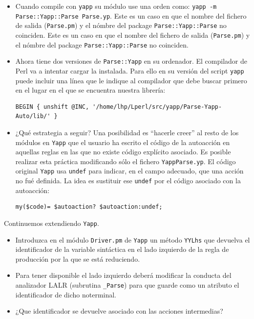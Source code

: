 \begin{itemize}
\item
Cuando compile con \verb|yapp| su módulo use 
una orden como: \verb|yapp -m Parse::Yapp::Parse Parse.yp|. 
Este es un caso en que el nombre del fichero de salida (\verb|Parse.pm|)
y el nómbre del package \verb|Parse::Yapp::Parse| no coinciden. 
Este es un caso en que el nombre del fichero de salida (\verb|Parse.pm|)
y el nómbre del package \verb|Parse::Yapp::Parse| no coinciden.
\item
Ahora tiene dos versiones de \verb|Parse::Yapp| en su ordenador.
El compilador de Perl va a intentar cargar la instalada. 
Para ello en su versión del script \verb|yapp| puede incluir
una línea que le indique al compilador que debe buscar primero
en el lugar en el que se encuentra nuestra librería:
\begin{verbatim}
BEGIN { unshift @INC, '/home/lhp/Lperl/src/yapp/Parse-Yapp-Auto/lib/' }
\end{verbatim}
\item ¿Qué estrategia a seguir? Una posibilidad es ``hacerle creer'' al
resto de los módulos en \verb|Yapp| que el usuario ha escrito el 
código de la autoacción en aquellas reglas en las que no existe 
código explícito asociado. Es posible realizar esta práctica modificando
sólo el fichero \verb|YappParse.yp|. El código original 
\verb|Yapp| usa \verb|undef|
para indicar, en el campo adecuado, que una acción no fué definida.
La idea es sustituir ese \verb|undef| por el código asociado con la
autoacción:

\begin{verbatim}
my($code)= $autoaction? $autoaction:undef;
\end{verbatim}

\end{itemize}

Continuemos extendiendo \verb|Yapp|.
\begin{itemize}
\item
Introduzca en el módulo \verb|Driver.pm| de \verb|Yapp|
un método \verb|YYLhs| que devuelva el identificador
de la variable sintáctica en el lado izquierdo de la regla 
de producción por la que se está reduciendo. 
\item
Para tener disponible el lado izquierdo
deberá modificar la conducta del analizador LALR 
(subrutina \verb|_Parse|) para que guarde como un atributo
el identificador de dicho noterminal.
\item
¿Que identificador se devuelve asociado con las acciones
intermedias?
\end{itemize}

